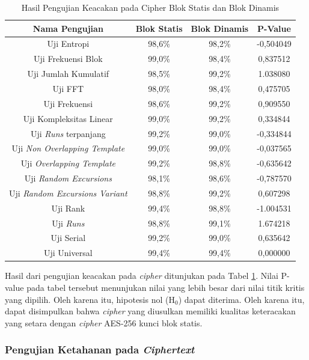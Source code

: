 \begin{table}[!h]
  \centering
  \caption{Hasil Pengujian Keacakan pada Cipher Blok Statis dan Blok Dinamis} \label{tab:test.statistic.cipher}
  \begin{tabular}{|c|c|c|c|}
    \hline
    \textbf{Nama Pengujian} & \textbf{Blok Statis} & \textbf{Blok Dinamis} & \textbf{P-Value} \\ \hline
    Uji Entropi & 98,6\% & 98,2\% & -0,504049 \\ \hline
    Uji Frekuensi Blok & 99,0\% & 98,4\% & 0,837512 \\ \hline
    Uji Jumlah Kumulatif & 98,5\% & 99,2\% & 1.038080 \\ \hline
    Uji FFT & 98,0\% & 98,4\% & 0,475705 \\ \hline
    Uji Frekuensi & 98,6\% & 99,2\% & 0,909550 \\ \hline
    Uji Kompleksitas Linear & 99,0\% & 99,2\% & 0,334844 \\ \hline
    Uji \emph{Runs} terpanjang & 99,2\% & 99,0\% & -0,334844 \\ \hline
    Uji \emph{Non Overlapping Template} & 99,0\% & 99,0\% & -0,037565 \\ \hline
    Uji \emph{Overlapping Template} & 99,2\% & 98,8\% & -0,635642 \\ \hline
    Uji \emph{Random Excursions} & 98,1\% & 98,6\% & -0,787570 \\ \hline
    Uji \emph{Random Excursions Variant} & 98,8\% & 99,2\% & 0,607298 \\ \hline
    Uji Rank & 99,4\% & 98,8\% & -1.004531 \\ \hline
    Uji \emph{Runs} & 98,8\% & 99,1\% & 1.674218 \\ \hline
    Uji Serial & 99,2\% & 99,0\% & 0,635642 \\ \hline
    Uji Universal & 99,4\% & 99,4\% & 0,000000 \\ \hline
  \end{tabular}
\end{table}

Hasil dari pengujian keacakan pada \emph{cipher} ditunjukan pada Tabel \ref{tab:test.statistic.cipher}. Nilai P-value pada tabel tersebut menunjukan nilai yang lebih besar dari nilai titik kritis yang dipilih. Oleh karena itu, hipotesis nol ($\text{H}_0$) dapat diterima. Oleh karena itu, dapat disimpulkan bahwa \emph{cipher} yang diusulkan memiliki kualitas keteracakan yang setara dengan \emph{cipher} AES-256 kunci blok statis.

\subsubsection{Pengujian Ketahanan pada \emph{Ciphertext}}

